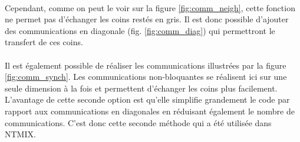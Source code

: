 


\paragraph{}Cependant, comme on peut le voir sur la figure \ref{fig:comm_neigh}, cette fonction ne permet pas d'échanger les coins restés en gris. Il est donc possible d'ajouter des communications en diagonale (fig. \ref{fig:comm_diag}) qui permettront le transfert de ces coins.

\paragraph{}Il est également possible de réaliser les communications illustrées par la figure \ref{fig:comm_synch}. Les communications non-bloquantes se réalisent ici sur une seule dimension à la fois et permettent d'échanger les coins plus facilement. L'avantage de cette seconde option est qu'elle simplifie grandement le code par rapport aux communications en diagonales en réduisant également le nombre de communications. C'est donc cette seconde méthode qui a été utilisée dans NTMIX.


